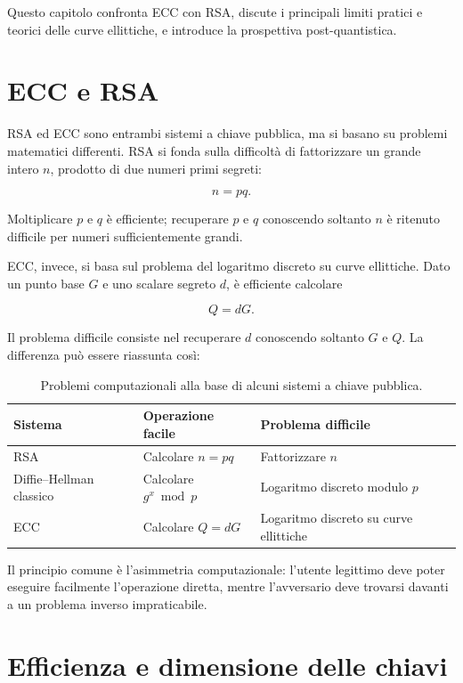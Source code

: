\documentclass[12pt,a4paper,oneside]{report}
\begin{document}
Questo capitolo confronta ECC con RSA, discute i principali limiti pratici e teorici delle curve ellittiche, e introduce la prospettiva post-quantistica.

\section{ECC e RSA}

RSA ed ECC sono entrambi sistemi a chiave pubblica, ma si basano su problemi matematici differenti. RSA si fonda sulla difficoltà di fattorizzare un grande intero \(n\), prodotto di due numeri primi segreti:

\[
n=pq.
\]

Moltiplicare \(p\) e \(q\) è efficiente; recuperare \(p\) e \(q\) conoscendo soltanto \(n\) è ritenuto difficile per numeri sufficientemente grandi.

ECC, invece, si basa sul problema del logaritmo discreto su curve ellittiche. Dato un punto base \(G\) e uno scalare segreto \(d\), è efficiente calcolare

\[
Q=dG.
\]

Il problema difficile consiste nel recuperare \(d\) conoscendo soltanto \(G\) e \(Q\). La differenza può essere riassunta così:

\begin{table}[h]
\centering
\begin{tabular}{lll}
\toprule
\textbf{Sistema} & \textbf{Operazione facile} & \textbf{Problema difficile} \\
\midrule
RSA & Calcolare \(n=pq\) & Fattorizzare \(n\) \\
Diffie--Hellman classico & Calcolare \(g^x \bmod p\) & Logaritmo discreto modulo \(p\) \\
ECC & Calcolare \(Q=dG\) & Logaritmo discreto su curve ellittiche \\
\bottomrule
\end{tabular}
\caption{Problemi computazionali alla base di alcuni sistemi a chiave pubblica.}
\label{tab:rsa-dh-ecc}
\end{table}

Il principio comune è l'asimmetria computazionale: l'utente legittimo deve poter eseguire facilmente l'operazione diretta, mentre l'avversario deve trovarsi davanti a un problema inverso impraticabile.

\section{Efficienza e dimensione delle chiavi}
\end{document}
